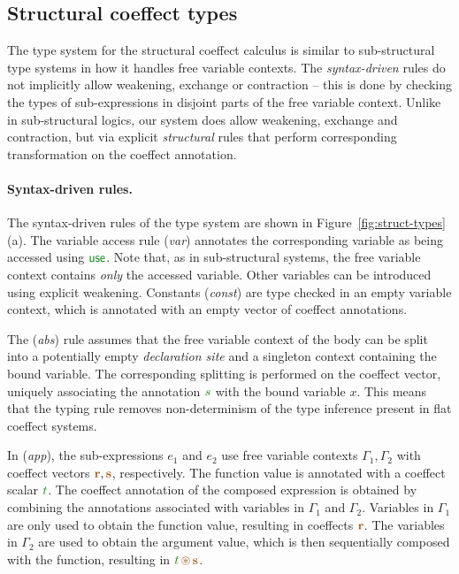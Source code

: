 
\subsection{Structural coeffect types}
\label{sec:struct-calculus-types}

The type system for the structural coeffect calculus is similar to sub-structural type systems
in how it handles free variable contexts. The \emph{syntax-driven} rules do not implicitly allow
weakening, exchange or contraction -- this is done by checking the types of sub-expressions
in disjoint parts of the free variable context. Unlike in sub-structural logics, our system
does allow weakening, exchange and contraction, but via explicit \emph{structural} rules that
perform corresponding transformation on the coeffect annotation.

\paragraph{Syntax-driven rules.}
The syntax-driven rules of the type system are shown in Figure~\ref{fig:struct-types} (a).
The variable access rule (\emph{var}) annotates the corresponding variable as being accessed
using $\cunit$. Note that, as in sub-structural systems, the free variable context contains
\emph{only} the accessed variable. Other variables can be introduced using explicit weakening.
Constants (\emph{const}) are type checked in an empty variable context, which is annotated with
an empty vector of coeffect annotations.

The (\emph{abs}) rule assumes that the free variable context of the body can be split into
a potentially empty \emph{declaration site} and a singleton context containing the bound
variable. The corresponding splitting is performed on the coeffect vector, uniquely associating
the annotation $\cclrd{s}$ with the bound variable $x$. This means that the typing rule removes
non-determinism of the type inference present in flat coeffect systems.

In (\emph{app}), the sub-expressions $e_1$ and $e_2$ use free variable contexts $\Gamma_1, \Gamma_2$
with coeffect vectors $\aclrd{\textbf{r}}, \aclrd{\textbf{s}}$, respectively. The function
value is annotated with a coeffect scalar $\cclrd{t}$.
The coeffect annotation of the composed expression is obtained by combining the annotations
associated with variables in $\Gamma_1$ and $\Gamma_2$. Variables in $\Gamma_1$ are only
used to obtain the function value, resulting in coeffects $\aclrd{\textbf{r}}$. The
variables in $\Gamma_2$ are used to obtain the argument value, which is then sequentially
composed with the function, resulting in $\cclrd{t}\,\aseq\,\aclrd{\textbf{s}}$.


